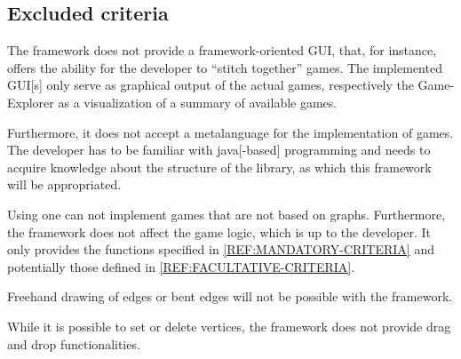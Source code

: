 \subsection{Excluded criteria}
The {\graphioli} framework does not provide a framework-oriented \gls{GUI}, that, for instance, offers the ability for the developer to ``stitch together'' games. The implemented \gls{GUI}[s] only serve as graphical output of the actual games, respectively the Game-Explorer as a visualization of a summary of available games.\par
Furthermore, it does not accept a \gls{metalanguage} for the implementation of games. The \gls{developer} has to be familiar with \Gls{java}[-based] programming and needs to acquire knowledge about the structure of the \gls{library}, as which this framework will be appropriated.\par
Using {\graphioli} one can not implement \glspl{game} that are not based on \glspl{graph}. Furthermore, the framework does not affect the game logic, which is up to the developer. It only provides the functions specified in \ref{REF:MANDATORY-CRITERIA} and potentially those defined in \ref{REF:FACULTATIVE-CRITERIA}.\par
Freehand drawing of \glspl{edge} or bent edges will not be possible with the {\graphioli} framework.\par
While it is possible to set or delete vertices, the framework does not provide drag and drop functionalities.\par